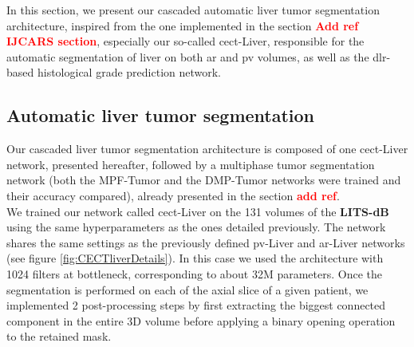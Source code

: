 \documentclass[]{article}
\newcommand{\pplfont}[1]{{\fontfamily{ppl}\selectfont #1}}
\newcommand{\lmttfont}[1]{{\fontfamily{lmtt}\selectfont #1}}
\newcommand{\todo}[1]{{\textcolor{red}{\textbf{#1}}}}
\begin{document}
In this section, we present our cascaded automatic liver tumor segmentation architecture, inspired from the one implemented in the section \todo{Add ref IJCARS section}, especially our so-called \pplfont{\ac{cect}-Liver}, responsible for the automatic segmentation of liver on both \ac{ar} and \ac{pv} volumes, as well as the \ac{dlr}-based histological grade prediction network.


\subsection{Automatic liver tumor segmentation} \label{subsect_auto_liver_tumor_seg}

Our cascaded liver tumor segmentation architecture is composed of one \pplfont{\ac{cect}-Liver} network, presented hereafter, followed by a multiphase tumor segmentation network (both the \pplfont{MPF-Tumor} and the \pplfont{DMP-Tumor} networks were trained and their accuracy compared), already presented in the section \todo{add ref}. \\
We trained our network called \pplfont{\ac{cect}-Liver} on the 131 volumes of the
\textbf{\lmttfont{LITS-dB}} using the same hyperparameters as the ones detailed
previously. The network shares the same settings as the previously defined \pplfont{\ac{pv}-Liver} and \pplfont{\ac{ar}-Liver} networks (see figure \ref{fig:CECTliverDetails}). In this case we used the architecture with 1024 filters at bottleneck, corresponding to about 32M parameters. Once the segmentation is performed on each of the axial slice of a given patient, we implemented 2 post-processing steps by first extracting the biggest connected component in the entire 3D volume before applying a binary opening operation to the retained mask.
\end{document}
